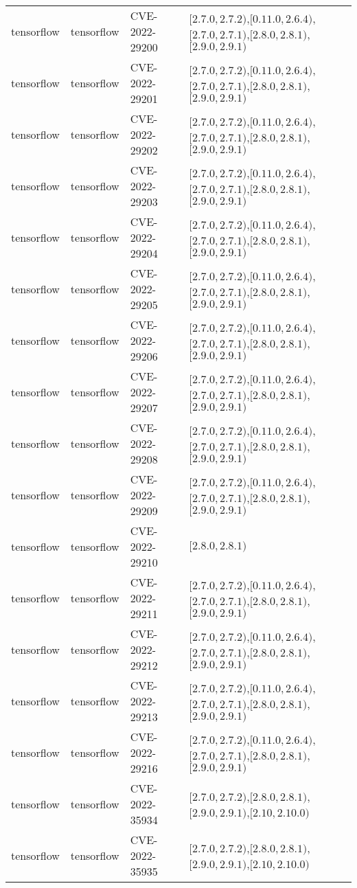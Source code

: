\begin{tabular}{llll}
tensorflow & tensorflow & CVE-2022-29200 & $[2.7.0,2.7.2)$,$[0.11.0,2.6.4)$,$[2.7.0,2.7.1)$,$[2.8.0,2.8.1)$,$[2.9.0,2.9.1)$ \\
tensorflow & tensorflow & CVE-2022-29201 & $[2.7.0,2.7.2)$,$[0.11.0,2.6.4)$,$[2.7.0,2.7.1)$,$[2.8.0,2.8.1)$,$[2.9.0,2.9.1)$ \\
tensorflow & tensorflow & CVE-2022-29202 & $[2.7.0,2.7.2)$,$[0.11.0,2.6.4)$,$[2.7.0,2.7.1)$,$[2.8.0,2.8.1)$,$[2.9.0,2.9.1)$ \\
tensorflow & tensorflow & CVE-2022-29203 & $[2.7.0,2.7.2)$,$[0.11.0,2.6.4)$,$[2.7.0,2.7.1)$,$[2.8.0,2.8.1)$,$[2.9.0,2.9.1)$ \\
tensorflow & tensorflow & CVE-2022-29204 & $[2.7.0,2.7.2)$,$[0.11.0,2.6.4)$,$[2.7.0,2.7.1)$,$[2.8.0,2.8.1)$,$[2.9.0,2.9.1)$ \\
tensorflow & tensorflow & CVE-2022-29205 & $[2.7.0,2.7.2)$,$[0.11.0,2.6.4)$,$[2.7.0,2.7.1)$,$[2.8.0,2.8.1)$,$[2.9.0,2.9.1)$ \\
tensorflow & tensorflow & CVE-2022-29206 & $[2.7.0,2.7.2)$,$[0.11.0,2.6.4)$,$[2.7.0,2.7.1)$,$[2.8.0,2.8.1)$,$[2.9.0,2.9.1)$ \\
tensorflow & tensorflow & CVE-2022-29207 & $[2.7.0,2.7.2)$,$[0.11.0,2.6.4)$,$[2.7.0,2.7.1)$,$[2.8.0,2.8.1)$,$[2.9.0,2.9.1)$ \\
tensorflow & tensorflow & CVE-2022-29208 & $[2.7.0,2.7.2)$,$[0.11.0,2.6.4)$,$[2.7.0,2.7.1)$,$[2.8.0,2.8.1)$,$[2.9.0,2.9.1)$ \\
tensorflow & tensorflow & CVE-2022-29209 & $[2.7.0,2.7.2)$,$[0.11.0,2.6.4)$,$[2.7.0,2.7.1)$,$[2.8.0,2.8.1)$,$[2.9.0,2.9.1)$ \\
tensorflow & tensorflow & CVE-2022-29210 & $[2.8.0,2.8.1)$ \\
tensorflow & tensorflow & CVE-2022-29211 & $[2.7.0,2.7.2)$,$[0.11.0,2.6.4)$,$[2.7.0,2.7.1)$,$[2.8.0,2.8.1)$,$[2.9.0,2.9.1)$ \\
tensorflow & tensorflow & CVE-2022-29212 & $[2.7.0,2.7.2)$,$[0.11.0,2.6.4)$,$[2.7.0,2.7.1)$,$[2.8.0,2.8.1)$,$[2.9.0,2.9.1)$ \\
tensorflow & tensorflow & CVE-2022-29213 & $[2.7.0,2.7.2)$,$[0.11.0,2.6.4)$,$[2.7.0,2.7.1)$,$[2.8.0,2.8.1)$,$[2.9.0,2.9.1)$ \\
tensorflow & tensorflow & CVE-2022-29216 & $[2.7.0,2.7.2)$,$[0.11.0,2.6.4)$,$[2.7.0,2.7.1)$,$[2.8.0,2.8.1)$,$[2.9.0,2.9.1)$ \\
tensorflow & tensorflow & CVE-2022-35934 & $[2.7.0,2.7.2)$,$[2.8.0,2.8.1)$,$[2.9.0,2.9.1)$,$[2.10,2.10.0)$ \\
tensorflow & tensorflow & CVE-2022-35935 & $[2.7.0,2.7.2)$,$[2.8.0,2.8.1)$,$[2.9.0,2.9.1)$,$[2.10,2.10.0)$ \\

\end{tabular}
